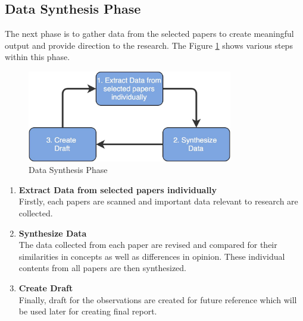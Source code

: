 \subsection{Data Synthesis Phase}\label{section:context/approach/data_synthesis_phase}
The next phase is to gather data from the selected papers to create meaningful output and provide direction to the research. The Figure \ref{fig:context/data_synthesis_phase} shows various steps within this phase.
\begin{figure}[H]
\begin{center}
\includegraphics[width=0.8\textwidth]{figures/introduction_data_synthesis_phase}
\caption{Data Synthesis Phase}
\label{fig:context/data_synthesis_phase}
\end{center}
\end{figure}

\begin{enumerate}
\item \textbf{Extract Data from selected papers individually}\\
Firstly, each papers are scanned and important data relevant to research are collected.
\item \textbf{Synthesize Data}\\
The data collected from each paper are revised and compared for their similarities in concepts as well as differences in opinion. These individual contents from all papers are then synthesized.
\item \textbf{Create Draft}\\
Finally, draft for the observations are created for future reference which will be used later for creating final report.
\end{enumerate}


